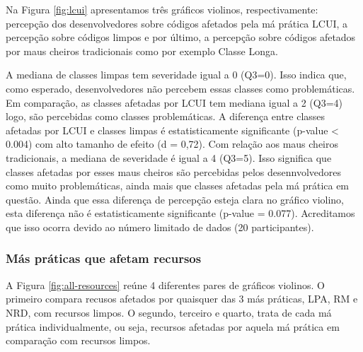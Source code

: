 Na Figura \ref{fig:lcui} apresentamos três gráficos violinos, respectivamente: percepção dos desenvolvedores sobre códigos afetados pela má prática \textsc{LCUI}, a percepção sobre códigos limpos e por último, a percepção sobre códigos afetados por maus cheiros tradicionais como por exemplo Classe Longa. 

A mediana de classes limpas tem severidade igual a 0 (Q3=0). Isso indica que, como esperado, desenvolvedores não percebem essas classes como problemáticas. Em comparação, as classes afetadas por \textsc{LCUI} tem mediana igual a 2 (Q3=4) logo, são percebidas como classes problemáticas. A diferença entre classes afetadas por \textsc{LCUI} e classes limpas é estatisticamente significante (p-value < 0.004) com alto tamanho de efeito (d = 0,72). Com relação aos maus cheiros tradicionais, a mediana de severidade é igual a 4 (Q3=5). Isso significa que classes afetadas por esses maus cheiros são percebidas pelos desennvolvedores como muito problemáticas, ainda mais que classes afetadas pela má prática em questão. Ainda que essa diferença de percepção esteja clara no gráfico violino, esta diferença não é estatisticamente significante (p-value = 0.077). Acreditamos que isso ocorra devido ao número limitado de dados (20 participantes).


\subsubsection{Más práticas que afetam recursos}

A Figura \ref{fig:all-resources} reúne 4 diferentes pares de gráficos violinos. O primeiro compara recusos afetados por quaisquer das 3 más práticas, \textsc{LPA}, \textsc{RM} e \textsc{NRD}, com recursos limpos. O segundo, terceiro e quarto, trata de cada má prática individualmente, ou seja, recursos afetadas por aquela má prática em comparação com recursos limpos. 

